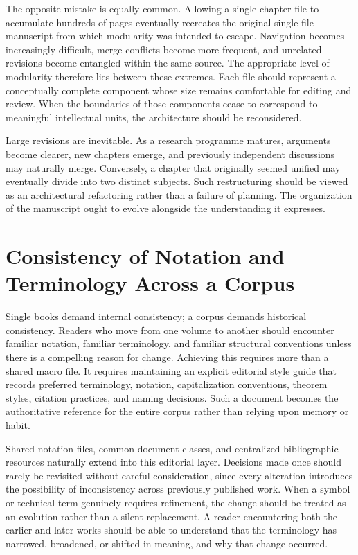 The opposite mistake is equally common. Allowing a single chapter file to accumulate hundreds of pages eventually recreates the original single-file manuscript from which modularity was intended to escape. Navigation becomes increasingly difficult, merge conflicts become more frequent, and unrelated revisions become entangled within the same source. The appropriate level of modularity therefore lies between these extremes. Each file should represent a conceptually complete component whose size remains comfortable for editing and review. When the boundaries of those components cease to correspond to meaningful intellectual units, the architecture should be reconsidered.

Large revisions are inevitable. As a research programme matures, arguments become clearer, new chapters emerge, and previously independent discussions may naturally merge. Conversely, a chapter that originally seemed unified may eventually divide into two distinct subjects. Such restructuring should be viewed as an architectural refactoring rather than a failure of planning. The organization of the manuscript ought to evolve alongside the understanding it expresses.

\hypertarget{consistency-of-notation-and-terminology-across-a-corpus}{%
\section{Consistency of Notation and Terminology Across a Corpus}\label{consistency-of-notation-and-terminology-across-a-corpus}}

Single books demand internal consistency; a corpus demands historical consistency. Readers who move from one volume to another should encounter familiar notation, familiar terminology, and familiar structural conventions unless there is a compelling reason for change. Achieving this requires more than a shared macro file. It requires maintaining an explicit editorial style guide that records preferred terminology, notation, capitalization conventions, theorem styles, citation practices, and naming decisions. Such a document becomes the authoritative reference for the entire corpus rather than relying upon memory or habit.

Shared notation files, common document classes, and centralized bibliographic resources naturally extend into this editorial layer. Decisions made once should rarely be revisited without careful consideration, since every alteration introduces the possibility of inconsistency across previously published work. When a symbol or technical term genuinely requires refinement, the change should be treated as an evolution rather than a silent replacement. A reader encountering both the earlier and later works should be able to understand that the terminology has narrowed, broadened, or shifted in meaning, and why that change occurred.

